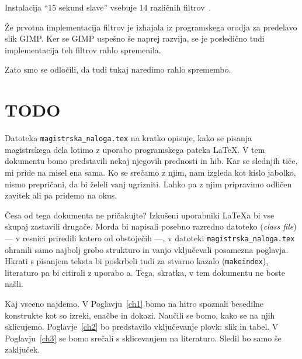 Instalacija ``15 sekund slave'' vsebuje 14 različnih filtrov~\cite[Poglavje~5]{diplomskaSamoJuvan}. 

Že prvotna implementacija filtrov je izhajala iz programskega orodja za predelavo slik GIMP. Ker se GIMP uspešno še naprej razvija, se je posledično tudi implementacija teh filtrov rahlo spremenila. 

Zato smo se odločili, da tudi tukaj naredimo rahlo spremembo. 


\chapter{TODO}
Datoteka {\tt magistrska\_naloga.tex} na kratko opisuje, kako se pisanja magistrskega dela lotimo z uporabo programskega pateka \LaTeX. V tem dokumentu bomo predstavili nekaj njegovih prednosti in hib. Kar se slednjih tiče, mi pride na misel ena sama. Ko se srečamo z njim, nam izgleda kot kislo jabolko, nismo prepričani, da bi želeli vanj ugrizniti. Lahko pa z njim pripravimo odličen zavitek ali pa pridemo na okus.

Česa od tega dokumenta ne pričakujte? Izkušeni uporabniki \LaTeX{}a bi vse skupaj zastavili
drugače. Morda bi napisali posebno razredno datoteko (\emph{class file}) --- v resnici priredili katero od obstoječih ---, v datoteki {\tt magistrska\_naloga.tex} ohranili samo najbolj grobo strukturo in vanjo vključevali  posamezna po\-glav\-ja. Hkrati s pisanjem teksta bi poskrbeli tudi za stvarno kazalo ({\tt makeindex}), literaturo pa bi citirali z uporabo {\BibTeX}{a}. Tega, skratka, v tem dokumentu ne boste našli.

Kaj vseeno najdemo. V Poglavju~\ref{ch1} bomo na hitro spoznali besedilne konstrukte kot so izreki, enačbe in dokazi. Naučili se bomo, kako se na njih sklicujemo. Poglavje~\ref{ch2} bo predstavilo vključevanje plovk: slik in tabel. V Poglavju~\ref{ch3} se bomo srečali s sklicevanjem na literaturo.
Sledil bo samo še zaključek.

